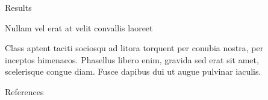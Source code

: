 \documentclass[final]{beamer}
\newlength{\sepwidth}
\newlength{\colwidth}
\newcommand{\separatorcolumn}{\begin{column}{\sepwidth}\end{column}}
\begin{document}
\begin{frame}[t]
\begin{columns}[t]
\begin{column}{\colwidth}
\begin{block}{Results}
  \end{block}

  \begin{block}{Nullam vel erat at velit convallis laoreet}

    Class aptent taciti sociosqu ad litora torquent per conubia nostra, per
    inceptos himenaeos. Phasellus libero enim, gravida sed erat sit amet,
    scelerisque congue diam. Fusce dapibus dui ut augue pulvinar iaculis.

  \end{block}

  \begin{block}{References}

    \nocite{*}
    \footnotesize{}

  \end{block}

\end{column}

\separatorcolumn
\end{columns}
\end{frame}
\end{document}
